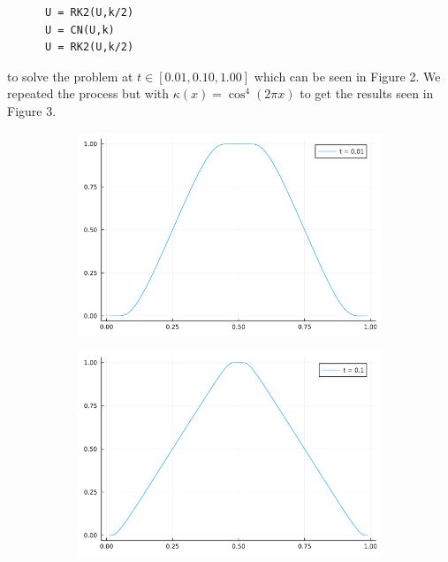 \documentclass[12pt]{report}
\begin{document}
\begin{solution}
\begin{verbatim}
      U = RK2(U,k/2)
      U = CN(U,k)
      U = RK2(U,k/2)
    \end{verbatim}
    to solve the problem at $t\in[0.01,0.10,1.00]$ which can be seen in Figure 2. We repeated the process but with $\kappa(x) = \cos^4(2\pi x)$ to get the results seen in Figure 3. 
    \begin{figure}[H] \label{4a}
      \centering
      \begin{subfigure}{0.495\linewidth}
        \centering
        \includegraphics[width=\linewidth]{images/4a-1.png}
      \end{subfigure}
      \begin{subfigure}{0.495\linewidth}
        \centering
        \includegraphics[width=\linewidth]{images/4a-2.png}
      \end{subfigure}
      \begin{subfigure}{0.495\linewidth}
        \centering

\end{subfigure}
\end{figure}
\end{solution}
\end{document}
